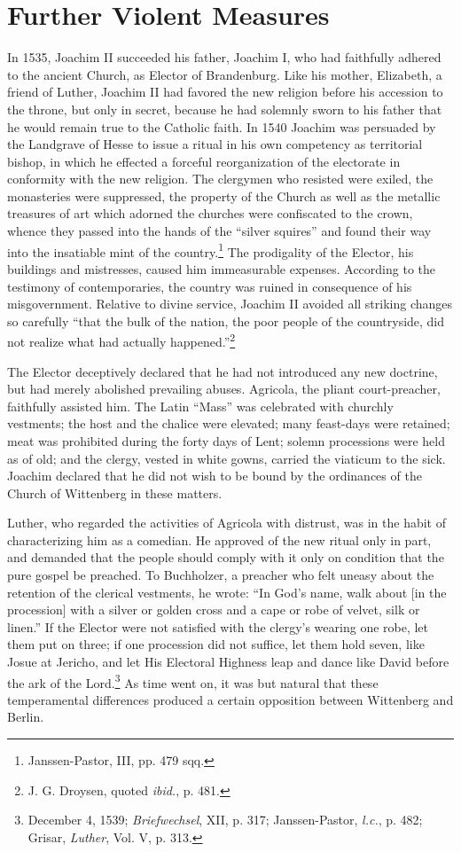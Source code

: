 \section{Further Violent Measures}

In 1535, Joachim II succeeded his father, Joachim I, who had faithfully
adhered to the ancient Church, as Elector of Brandenburg. Like
his mother, Elizabeth, a friend of Luther, Joachim II had favored the
new religion before his accession to the throne, but only in secret,
because he had solemnly sworn to his father that he would remain
true to the Catholic faith. In 1540 Joachim was persuaded by the
Landgrave of Hesse to issue a ritual in his own competency as territorial
bishop, in which he effected a forceful reorganization of the
electorate in conformity with the new religion. The clergymen who
resisted were exiled, the monasteries were suppressed, the property of
the Church as well as the metallic treasures of art which adorned the
churches were confiscated to the crown, whence they passed into the
hands of the “silver squires” and found their way into the insatiable
mint of the country.\footnote{Janssen-Pastor, III, pp. 479 sqq.}
The prodigality of the Elector, his buildings
and mistresses, caused him immeasurable expenses. According to the
testimony of contemporaries, the country was ruined in consequence
of his misgovernment. Relative to divine service, Joachim II avoided
all striking changes so carefully “that the bulk of the nation, the poor
people of the countryside, did not realize what had actually happened.”\footnote{J. G. Droysen, quoted \textit{ibid.}, p. 481.}

The Elector deceptively declared that he had not introduced
any new doctrine, but had merely abolished prevailing abuses.
Agricola, the pliant court-preacher, faithfully assisted him. The Latin
“Mass” was celebrated with churchly vestments; the host and the
chalice were elevated; many feast-days were retained; meat was prohibited
during the forty days of Lent; solemn processions were held
as of old; and the clergy, vested in white gowns, carried the viaticum
to the sick. Joachim declared that he did not wish to be bound by
the ordinances of the Church of Wittenberg in these matters.

Luther, who regarded the activities of Agricola with distrust, was
in the habit of characterizing him as a comedian. He approved of the
new ritual only in part, and demanded that the people should comply
with it only on condition that the pure gospel be preached. To Buchholzer,
a preacher who felt uneasy about the retention of the clerical
vestments, he wrote: “In God’s name, walk about [in the procession]
with a silver or golden cross and a cape or robe of velvet, silk or
linen.” If the Elector were not satisfied with the clergy’s wearing one
robe, let them put on three; if one procession did not suffice, let them
hold seven, like Josue at Jericho, and let His Electoral Highness leap
and dance like David before the ark of the Lord.\footnote
{December 4, 1539; \textit{Briefwechsel}, XII, p. 317; Janssen-Pastor, \textit{l.c.}, p. 482; Grisar,
\textit{Luther}, Vol. V, p. 313.}
As time went on,
it was but natural that these temperamental differences produced a
certain opposition between Wittenberg and Berlin.

